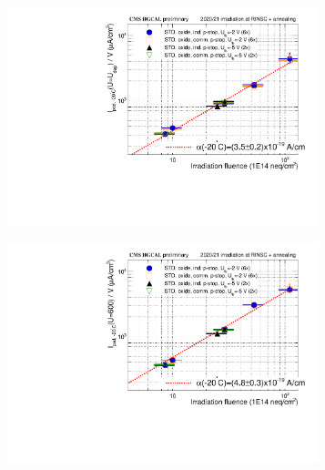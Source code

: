 \begin{figure}
	\captionsetup[subfigure]{aboveskip=-1pt,belowskip=-1pt}
	\begin{subfigure}[b]{0.49\textwidth}
		\centering
		\includegraphics[width=0.99\textwidth]{plots/alpha/alpha_Udep.pdf}
		\subcaption{
			}
			\label{plot:alpha_Udep}
	\end{subfigure}		
	\hfill
	\centering
	\begin{subfigure}[b]{0.49\textwidth}
		\centering
		\includegraphics[width=0.99\textwidth]{plots/alpha/alpha_600V.pdf}
		\subcaption{
			}
			\label{plot:alpha_600}
	\end{subfigure}
	\hfill
	\begin{subfigure}[b]{0.49\textwidth}
		\centering

\end{subfigure}
\end{figure}
